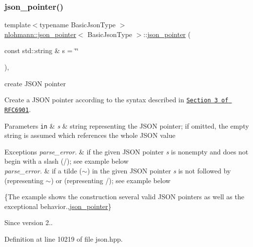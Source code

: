 \subsubsection{\texorpdfstring{json\+\_\+pointer()}{json\_pointer()}}
{\footnotesize\ttfamily template$<$typename Basic\+Json\+Type $>$ \\
\hyperlink{classnlohmann_1_1json__pointer}{nlohmann\+::json\+\_\+pointer}$<$ Basic\+Json\+Type $>$\+::\hyperlink{classnlohmann_1_1json__pointer}{json\+\_\+pointer} (\begin{DoxyParamCaption}\item[{const std\+::string \&}]{s = {\ttfamily \char`\"{}\char`\"{}} }\end{DoxyParamCaption})\hspace{0.3cm}{\ttfamily [inline]}, {\ttfamily [explicit]}}



create J\+S\+ON pointer 

Create a J\+S\+ON pointer according to the syntax described in \href{https://tools.ietf.org/html/rfc6901#section-3}{\tt Section 3 of R\+F\+C6901}.


\begin{DoxyParams}[1]{Parameters}
\mbox{\tt in}  & {\em s} & string representing the J\+S\+ON pointer; if omitted, the empty string is assumed which references the whole J\+S\+ON value\\
\hline
\end{DoxyParams}

\begin{DoxyExceptions}{Exceptions}
{\em parse\+\_\+error.} & if the given J\+S\+ON pointer {\itshape s} is nonempty and does not begin with a slash ({\ttfamily /}); see example below\\
\hline
{\em parse\+\_\+error.} & if a tilde ({\ttfamily $\sim$}) in the given J\+S\+ON pointer {\itshape s} is not followed by {} (representing {\ttfamily $\sim$}) or {} (representing {\ttfamily /}); see example below\\
\hline
\end{DoxyExceptions}
\{The example shows the construction several valid J\+S\+ON pointers as well as the exceptional behavior.,\hyperlink{classnlohmann_1_1json__pointer}{json\+\_\+pointer}\}

\begin{DoxySince}{Since}
version 2.. 
\end{DoxySince}


Definition at line 10219 of file json.\+hpp.



